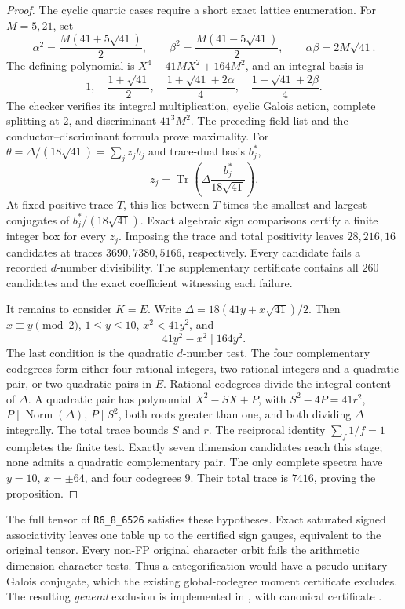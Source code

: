 \begin{proof}
The cyclic quartic cases require a short exact lattice enumeration. For
$M=5,21$, set
\[
 \alpha^2=\frac{M(41+5\sqrt{41})}{2},\qquad
 \beta^2=\frac{M(41-5\sqrt{41})}{2},\qquad
 \alpha\beta=2M\sqrt{41}.
\]
The defining polynomial is $X^4-41MX^2+164M^2$, and an integral basis is
\[
 1,\quad\frac{1+\sqrt{41}}2,\quad
 \frac{1+\sqrt{41}+2\alpha}4,\quad
 \frac{1-\sqrt{41}+2\beta}4.
\]
The checker verifies its integral multiplication, cyclic Galois action,
complete splitting at $2$, and discriminant $41^3M^2$. The preceding field
list and the conductor--discriminant formula prove maximality.
For $\theta=\Delta/(18\sqrt{41})=\sum_jz_jb_j$ and trace-dual basis $b_j^*$,
\[
 z_j=\operatorname{Tr}\left(\Delta\frac{b_j^*}{18\sqrt{41}}\right).
\]
At fixed positive trace $T$, this lies between $T$ times the smallest and
largest conjugates of $b_j^*/(18\sqrt{41})$. Exact algebraic sign comparisons
certify a finite integer box for every $z_j$. Imposing the trace and total
positivity leaves $28,216,16$ candidates at traces $3690,7380,5166$,
respectively. Every candidate fails a recorded $d$-number divisibility.
The supplementary certificate contains all $260$ candidates and the exact
coefficient witnessing each failure.

It remains to consider $K=E$. Write
$\Delta=18(41y+x\sqrt{41})/2$. Then $x\equiv y\pmod2$, $1\le y\le10$,
$x^2<41y^2$, and
\[
 41y^2-x^2\mid164y^2.
\]
The last condition is the quadratic $d$-number test. The four complementary
codegrees form either four rational integers, two rational integers and a
quadratic pair, or two quadratic pairs in $E$. Rational codegrees divide
the integral content of $\Delta$. A quadratic pair has polynomial
$X^2-SX+P$, with $S^2-4P=41r^2$, $P\mid\operatorname{Norm}(\Delta)$,
$P\mid S^2$, both roots greater than one, and both dividing $\Delta$
integrally. The total trace bounds $S$ and $r$. The reciprocal identity
$\sum_f1/f=1$ completes the finite test. Exactly seven dimension candidates
reach this stage; none admits a quadratic complementary pair. The only
complete spectra have $y=10$, $x=\pm64$, and four codegrees $9$.
Their total trace is $7416$, proving the proposition.
\end{proof}

The full tensor of \texttt{R6\_8\_6526} satisfies these hypotheses.
Exact saturated signed associativity leaves one table up to the certified
sign gauges, equivalent to the original tensor. Every non-FP original
character orbit fails the arithmetic dimension-character tests. Thus a
categorification would have a pseudo-unitary Galois conjugate, which the
existing global-codegree moment certificate excludes. The resulting
\emph{general} exclusion is implemented in
, with canonical certificate
.

